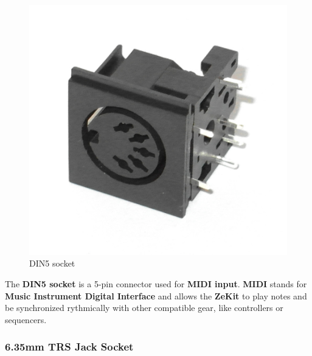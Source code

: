 \documentclass{scrartcl}
\begin{document}
\begin{figure}[!ht]
    \begin{center}
        \includegraphics[scale=0.15]{assets/zekit-din.jpg}
        \caption{DIN5 socket}
    \end{center}
\end{figure}

The \textbf{DIN5 socket} is a 5-pin connector used for \textbf{MIDI input}. \textbf{MIDI} stands for \textbf{Music Instrument Digital Interface} and allows the \textbf{ZeKit} to play notes and be synchronized rythmically with other compatible gear, like controllers or sequencers.

\subsubsection{6.35mm TRS Jack Socket}
\end{document}
